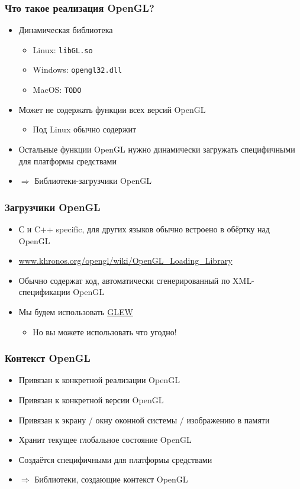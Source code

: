 \documentclass{beamer}
\begin{document}
\begin{frame}[fragile]
\frametitle{Что такое реализация OpenGL?}
\begin{itemize}
\item Динамическая библиотека
\begin{itemize}
\item Linux: \verb|libGL.so|
\item Windows: \verb|opengl32.dll|
\item MacOS: \verb|TODO|
\end{itemize}
\pause
\item Может не содержать функции всех версий OpenGL
\begin{itemize}
\item Под Linux обычно содержит
\end{itemize}
\item Остальные функции OpenGL нужно динамически загружать специфичными для платформы средствами
\item $\Longrightarrow$ Библиотеки-загрузчики OpenGL
\end{itemize}
\end{frame}

\begin{frame}
\frametitle{Загрузчики OpenGL}
\begin{itemize}
\item С и C++ specific, для других языков обычно встроено в обёртку над OpenGL
\item \url{www.khronos.org/opengl/wiki/OpenGL_Loading_Library}
\item Обычно содержат код, автоматически сгенерированный по XML-спецификации OpenGL
\item Мы будем использовать {\color{blue}\underline{GLEW}}
\begin{itemize}
\item Но вы можете использовать что угодно!
\end{itemize}
\end{itemize}
\end{frame}

\begin{frame}
\frametitle{Контекст OpenGL}
\begin{itemize}
\item Привязан к конкретной реализации OpenGL
\item Привязан к конкретной версии OpenGL
\item Привязан к экрану / окну оконной системы / изображению в памяти
\item Хранит текущее глобальное состояние OpenGL
\item Создаётся специфичными для платформы средствами
\item $\Longrightarrow$ Библиотеки, создающие контекст OpenGL
\end{itemize}
\end{frame}
\end{document}
